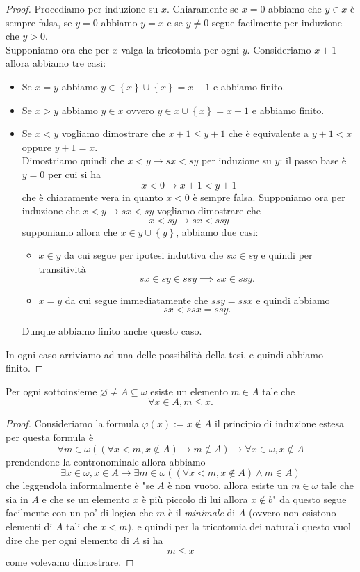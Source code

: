 \documentclass[11pt]{scrartcl}
\newcommand{\eset}{\varnothing}
\begin{document}
 	\begin{proof}
 		Procediamo per induzione su $x$. Chiaramente se $x=0$ abbiamo che $y\in x$ è sempre falsa, se $y=0$ abbiamo $y=x$ e se $y\ne 0$ segue facilmente per induzione che $y>0$. \\
 		Supponiamo ora che per $x$ valga la tricotomia per ogni $y$. Consideriamo $x+1$ allora abbiamo tre casi:
 		\begin{itemize}
 			\item Se $x=y$ abbiamo $y\in \left\{x\right\}\cup \left\{x\right\}=x+1$ e abbiamo finito.
 			\item Se $x>y$ abbiamo $y\in x$ ovvero $y\in x\cup \left\{x\right\}=x+1$ e abbiamo finito. 
 			\item Se $x<y$ vogliamo dimostrare che $x+1\le y+1$ che è equivalente a $y+1<x$ oppure $y+1=x$. \\
 			Dimostriamo quindi che $x<y\to sx<sy$ per induzione su $y$: il passo base è $y=0$ per cui si ha
 			$$x<0\to x+1<y+1$$
 			che è chiaramente vera in quanto $x<0$ è sempre falsa. Supponiamo ora per induzione che 
 			$x<y\to sx<sy$
 			vogliamo dimostrare che 
 			$$x<sy\to sx<ssy$$
 			supponiamo allora che $x\in y\cup \left\{y\right\}$, abbiamo due casi:
 			\begin{itemize}
 				\item $x\in y$ da cui segue per ipotesi induttiva che $sx\in sy$ e quindi per transitività 
 				$$sx\in sy\in ssy\implies sx\in ssy.$$
 				\item $x=y$ da cui segue immediatamente che $ssy=ssx$ e quindi abbiamo
 				$$sx<ssx=ssy.$$
 			\end{itemize}
 			Dunque abbiamo finito anche questo caso.
 		\end{itemize} 
 		In ogni caso arriviamo ad una delle possibilità della tesi, e quindi abbiamo finito.
 	\end{proof}
 	\begin{proposition}
 		Per ogni sottoinsieme $\eset\ne A\subseteq \omega$ esiste un elemento $m\in A$ tale che
 		$$\forall x\in A,m\le x.$$
 	\end{proposition}
 	\begin{proof}
 		Consideriamo la formula $\varphi(x):=x\not\in A$ il principio di induzione estesa per questa formula è
 		$$\forall m\in \omega\left((\forall x<m,x\not\in A)\to m\not\in A\right)\to \forall x\in \omega,x\not\in A$$
 		prendendone la contronominale allora abbiamo
 		$$\exists x\in \omega,x\in A\to \exists m\in \omega\left(\left(\forall x<m,x\not\in A\right)\land m\in A\right)$$
 		che leggendola informalmente è "se $A$ è non vuoto, allora esiste un $m\in\omega$ tale che sia in $A$ e che se un elemento $x$ è più piccolo di lui allora $x\not\in b$" da questo segue facilmente con un po' di logica che $m$ è il \textit{minimale} di $A$ (ovvero non esistono elementi di $A$ tali che $x<m$), e quindi per la tricotomia dei naturali questo vuol dire che per ogni elemento di $A$ si ha
 		$$m\le x$$
 		come volevamo dimostrare. 
 	\end{proof}
\end{document}
